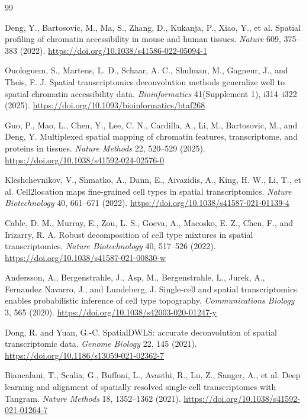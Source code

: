 \documentclass[11pt]{article}
\begin{document}
\newpage
\begin{thebibliography}{99}

Deng, Y., Bartosovic, M., Ma, S., Zhang, D., Kukanja, P., Xiao, Y., et al.
Spatial profiling of chromatin accessibility in mouse and human tissues.
\textit{Nature} 609, 375--383 (2022).
\url{https://doi.org/10.1038/s41586-022-05094-1}

Ouologuem, S., Martens, L. D., Schaar, A. C., Shulman, M., Gagneur, J., and Theis, F. J.
Spatial transcriptomics deconvolution methods generalize well to spatial chromatin accessibility data.
\textit{Bioinformatics} 41(Supplement 1), i314--i322 (2025).
\url{https://doi.org/10.1093/bioinformatics/btaf268}

Guo, P., Mao, L., Chen, Y., Lee, C. N., Cardilla, A., Li, M., Bartosovic, M., and Deng, Y.
Multiplexed spatial mapping of chromatin features, transcriptome, and proteins in tissues.
\textit{Nature Methods} 22, 520--529 (2025).
\url{https://doi.org/10.1038/s41592-024-02576-0}

Kleshchevnikov, V., Shmatko, A., Dann, E., Aivazidis, A., King, H. W., Li, T., et al.
Cell2location maps fine-grained cell types in spatial transcriptomics.
\textit{Nature Biotechnology} 40, 661--671 (2022).
\url{https://doi.org/10.1038/s41587-021-01139-4}

Cable, D. M., Murray, E., Zou, L. S., Goeva, A., Macosko, E. Z., Chen, F., and Irizarry, R. A.
Robust decomposition of cell type mixtures in spatial transcriptomics.
\textit{Nature Biotechnology} 40, 517--526 (2022).
\url{https://doi.org/10.1038/s41587-021-00830-w}

Andersson, A., Bergenstrahle, J., Asp, M., Bergenstrahle, L., Jurek, A., Fernandez Navarro, J., and Lundeberg, J.
Single-cell and spatial transcriptomics enables probabilistic inference of cell type topography.
\textit{Communications Biology} 3, 565 (2020).
\url{https://doi.org/10.1038/s42003-020-01247-y}

Dong, R. and Yuan, G.-C.
SpatialDWLS: accurate deconvolution of spatial transcriptomic data.
\textit{Genome Biology} 22, 145 (2021).
\url{https://doi.org/10.1186/s13059-021-02362-7}

Biancalani, T., Scalia, G., Buffoni, L., Avasthi, R., Lu, Z., Sanger, A., et al.
Deep learning and alignment of spatially resolved single-cell transcriptomes with Tangram.
\textit{Nature Methods} 18, 1352--1362 (2021).
\url{https://doi.org/10.1038/s41592-021-01264-7}


\end{thebibliography}
\end{document}

